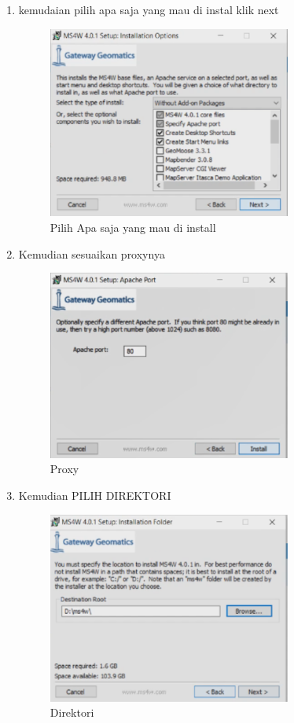 \begin{enumerate}
    \item kemudaian pilih apa saja yang mau di instal klik next
    \hfill\break
	\begin{figure}[H]
		\includegraphics[width=8cm]{figures/1174050/1174050/2.PNG}
		\centering
		\caption{Pilih Apa saja yang mau di install}
	\end{figure}
	
    \item Kemudian sesuaikan proxynya 
    \hfill\break
	\begin{figure}[H]
		\includegraphics[width=8cm]{figures/1174050/1174050/3.PNG}
		\centering
		\caption{Proxy}
	\end{figure}

	 \item Kemudian PILIH DIREKTORI
    \hfill\break
	\begin{figure}[H]
		\includegraphics[width=8cm]{figures/1174050/1174050/4.PNG}
		\centering
		\caption{Direktori}
	\end{figure}
	

\end{enumerate}

